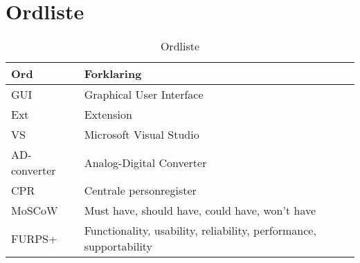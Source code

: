 \chapter{Ordliste}

\flushleft
\begin{table}[h!]
	\begin{tabular}{l|l}
		\textbf{Ord} & \textbf {Forklaring} \\ 
		\hline
		GUI & Graphical User Interface \\
		\hline
		Ext & Extension \\
		\hline
		VS & Microsoft Visual Studio \\
		\hline
		AD-converter & Analog-Digital Converter \\
		\hline
		CPR & Centrale personregister \\
		\hline
		MoSCoW & Must have, should have, could have, won't have \\
		\hline
		FURPS+ & Functionality, usability, reliability, performance, supportability \\
		\hline
	\end{tabular}
\caption{Ordliste}
\label{table:Ordliste}
\end{table}
